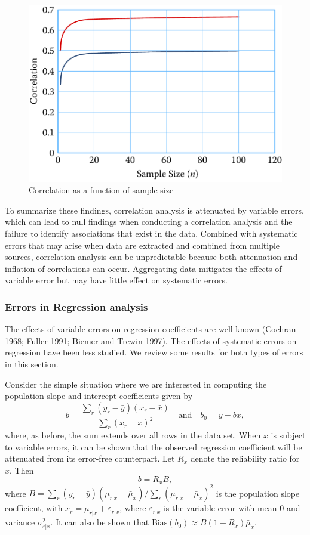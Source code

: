 \documentclass[]{krantz}
\begin{document}
\begin{figure}

{\centering \includegraphics[width=0.7\linewidth]{ChapterError/figures/fig10-5} 

}

\caption{Correlation as a function of sample size}\label{fig:fig10-5}
\end{figure}

To summarize these findings, correlation analysis is attenuated by
variable errors, which can lead to null findings when conducting a
correlation analysis and the failure to identify associations that exist
in the data. Combined with systematic errors that may arise when data
are extracted and combined from multiple sources, correlation analysis
can be unpredictable because both attenuation and inflation of
correlations can occur. Aggregating data mitigates the effects of
variable error but may have little effect on systematic errors.

\subsubsection{Errors in Regression analysis}\label{sec:10-4.2.5}

The effects of variable errors on regression coefficients are well known
(Cochran \protect\hyperlink{ref-cochran1968errors}{1968}; Fuller
\protect\hyperlink{ref-fuller1991regression}{1991}; Biemer and Trewin
\protect\hyperlink{ref-biemer1997review}{1997}). The effects of
systematic errors on regression have been less studied. We review some
results for both types of errors in this section.

Consider the simple situation where we are interested in computing the
population slope and intercept coefficients given by
\[\label{eq:10-1.10}
b = \frac{\sum_r {(y_r - \bar{y})(x_r - \bar{x})} }{\sum_r {(x_r
- \bar{x})^2} }\quad\mbox{and}\quad b_0 = \bar{y} - b\bar{x},\] where,
as before, the sum extends over all rows in the data set. When \(x\) is
subject to variable errors, it can be shown that the observed regression
coefficient will be attenuated from its error-free counterpart. Let
\(R_x\) denote the reliability ratio for \(x\). Then
\[\label{eq:10-1.11}
b = R_x B,\] where
\(B = \sum_r {(y_r - \bar{y})(\mu_{r\vert x} - \bar{\mu }_x )} / \sum_r {(\mu_{r\vert x} - \bar{\mu }_x )^2}\)
is the population slope coefficient, with
\(x_r = \mu_{r\vert x} + \varepsilon_{r\vert x}\), where
\(\varepsilon_{r\vert x}\) is the variable error with mean 0 and
variance \(\sigma_{\varepsilon\vert x}^2\). It can also be shown that
\(\mbox{Bias}(b_0 ) \approx B(1 - R_x )\bar{\mu }_x\).
\end{document}

